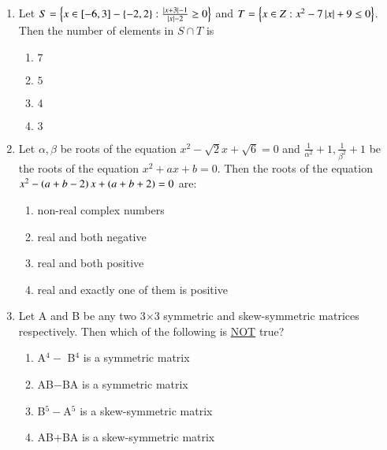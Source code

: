 \documentclass[journal]{IEEEtran}
\begin{document}
\begin{enumerate}
\setcounter{enumi}{0}
 
    \item Let $S=\left\{ x\in \left[-6,3\right]-\left\{-2,2\right\}:\frac{\left\vert x+3\right\vert-1}{\left\vert x\right\vert-2} \geq 0\right\}$ and $T=\left\{ x\in Z:x^2-7\left\vert x\right\vert+9\leq0\right\}$. Then the number of elements in $S\cap T$ is

        \begin{multicols}{4}
            \begin{enumerate}
                \item $7$
                \item $5$
                \item $4$
                \item $3$
            \end{enumerate}
        \end{multicols}

    \item Let $\alpha,\beta$ be roots of the equation $x^2-\sqrt{2}x+\sqrt{6}=0$ and $\frac{1}{\alpha^2}+1,\frac{1}{\beta^2}+1$ be the roots of the equation $x^2+ax+b=0$. Then the roots of the equation $x^2-\left(a+b-2\right)x+\left(a+b+2\right)=0$ are:

		\begin{multicols}{2}
			\begin{enumerate}
				\item non-real complex numbers
				\item real and both negative
				\item real and both positive
				\item real and exactly one of them is positive
			\end{enumerate}
		\end{multicols}

    \item Let A and B be any two 3$\times$3 symmetric and skew-symmetric matrices respectively. Then which of the following is \underline{NOT} true?

        \begin{multicols}{2}
            \begin{enumerate}
                \item A$^4 -$ B$^4$ is a symmetric matrix
                \item AB$-$BA is a symmetric matrix
                \item B$^5-$A$^5$ is a skew-symmetric matrix
                \item AB$+$BA is a skew-symmetric matrix
            \end{enumerate}
        \end{multicols}


\end{enumerate}
\end{document}
